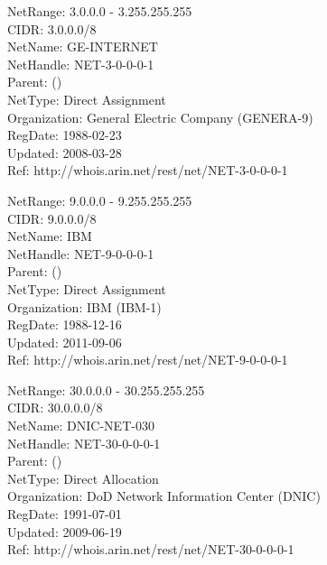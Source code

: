 \documentclass[aspectratio=43]{beamer}
\begin{document}
\begin{frame} 
	\begin{exampleblock}{}
	NetRange:       3.0.0.0 - 3.255.255.255\\
	CIDR:           3.0.0.0/8\\
	NetName:        GE-INTERNET\\
	NetHandle:      NET-3-0-0-0-1\\
	Parent:          ()\\
	NetType:        Direct Assignment\\
	Organization:   General Electric Company (GENERA-9)\\
	RegDate:        1988-02-23\\
	Updated:        2008-03-28\\
	Ref:            http://whois.arin.net/rest/net/NET-3-0-0-0-1\\

	\end{exampleblock}
\end{frame}

\begin{frame} 
	\begin{exampleblock}{}
	NetRange:       9.0.0.0 - 9.255.255.255\\
	CIDR:           9.0.0.0/8\\
	NetName:        IBM\\
	NetHandle:      NET-9-0-0-0-1\\
	Parent:          ()\\
	NetType:        Direct Assignment\\
	Organization:   IBM (IBM-1)\\
	RegDate:        1988-12-16\\
	Updated:        2011-09-06\\
	Ref:            http://whois.arin.net/rest/net/NET-9-0-0-0-1
	\end{exampleblock}
\end{frame}

\begin{frame} 
	\begin{exampleblock}{}
	NetRange:       30.0.0.0 - 30.255.255.255\\
	CIDR:           30.0.0.0/8\\
	NetName:        DNIC-NET-030\\
	NetHandle:      NET-30-0-0-0-1\\
	Parent:          ()\\
	NetType:        Direct Allocation\\
	Organization:   DoD Network Information Center (DNIC)\\
	RegDate:        1991-07-01\\
	Updated:        2009-06-19\\
	Ref:            http://whois.arin.net/rest/net/NET-30-0-0-0-1\\
	\end{exampleblock}
\end{frame}
\end{document}
